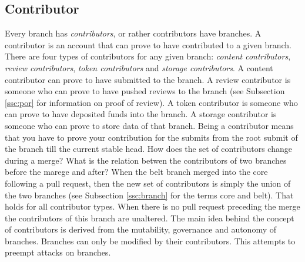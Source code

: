 \subsection{Contributor}
\label{ssc:contributors}
Every branch has \textit{contributors}, or rather contributors have branches. A contributor is an account that can prove to have contributed to a given branch. There are four types of contributors for any given branch: \textit{content contributors}, \textit{review contributors}, \textit{token contributors} and \textit{storage contributors}. A content contributor can prove to have submitted to the branch. A review contributor is someone who can prove to have pushed reviews to the branch (see Subsection \ref{ssc:por} for information on proof of review). A token contributor is someone who can prove to have deposited funds into the branch. A storage contributor is someone who can prove to store data of that branch. Being a contributor means that you have to prove your contribution for the submits from the root submit of the branch till the current stable head.
How does the set of contributors change during a merge? What is the relation betwen the contributors of two branches before the marege and after? When the belt branch merged into the core following a pull request, then the new set of contributors is simply the union of the two branches (see Subsection \ref{ssc:branch} for the terms core and belt). That holds for all contributor types. When there is no pull request preceding the merge the contributors of this branch are unaltered.
The main idea behind the concept of contributors is derived from the mutability, governance and autonomy of branches. Branches can only be modified by their contributors. This attempts to preempt attacks on branches.

% 

% 
% 
% 
% 
% 


